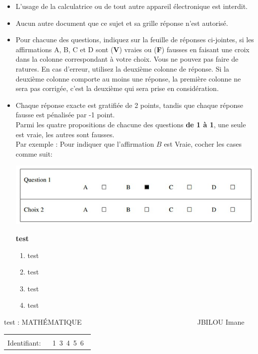 \documentclass{book}%
\begin{document}
\begin{itemize}%
\item%
L'usage de la calculatrice ou de tout autre appareil électronique est interdit.%
\item%
Aucun autre document que ce sujet et sa grille réponse n'est autorisé.%
\item%
Pour chacune des questions, indiquez sur la feuille de réponses ci-jointes, si les affirmations A, B, C et D sont (\textbf{V}) vraies ou (\textbf{F}) fausses en faisant une croix dans la colonne correspondant à votre choix. Vous ne pouvez pas faire de ratures. En cas d'erreur, utilisez la deuxième colonne de réponse. Si la deuxième colonne comporte au moins une réponse, la première colonne ne sera pas corrigée, c'est la deuxième qui sera prise en considération.%
\item%
Chaque réponse exacte est gratifiée de 2 points, tandis que chaque réponse fausse est pénalisée par -1 point. \\ 	Parmi les quatre propositions de chacune des questions \textbf{de 1 à 1}, une seule est vraie, les autres sont fausses. \\ 	Par exemple : Pour indiquer que l'affirmation $B$ est Vraie, cocher les cases comme suit:  \\ \begin{center}	\includegraphics[scale=0.8]{reponses.png} \end{center}%
\thispagestyle{empty}%
\begin{exercise}%
\textbf{test }%
\begin{enumerate}[label=\textbf{\Alph*. }]%
\item%
test%
\item%
test%
\item%
test%
\item%
test%
\end{enumerate}%
\end{exercise}%
\end{itemize}%
\newpage%
\thispagestyle{empty}%
test : MATHÉMATIQUE $\qquad \qquad \qquad \qquad \qquad \qquad \qquad \qquad$ JBILOU Imane%
\begin{flushright}%
\begin{tabular}{|l|}%
\hline%
 \\%
\thispagestyle{empty}%
Identifiant: $\quad$ {\Large 1~3~4~5~6~}%
 \\%
\hline%
\end{tabular}%
\end{flushright}%
\end{document}
